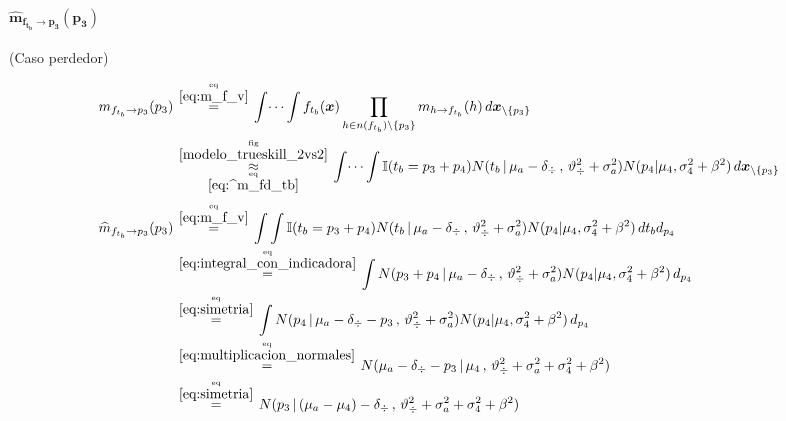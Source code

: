 \documentclass[article]{jss}
\newcommand\hfrac[2]{\genfrac{}{}{0pt}{}{#1}{#2}} %
\begin{document}
\begin{appendix}
\paragraph{$\bm{\widehat{m}_{f_{t_b} \rightarrow p_3}(p_3)}$} (Caso perdedor)

\begin{equation}\label{eq:^m_ftb_p}
\begin{split}
m_{f_{t_b} \rightarrow p_3}(p_3) & \overset{\hfrac{\text{eq}}{\ref{eq:m_f_v}}}{=} \int \dots \int f_{t_b}(\bm{x}) \prod_{h \in n(f_{t_b}) \setminus \{p_3\} } m_{h \rightarrow f_{t_b}}(h) \, d\bm{x}_{\setminus \{p_3\} }  \\
&\overset{\hfrac{\text{fig}}{\ref{modelo_trueskill_2vs2}}}{\underset{\hfrac{\text{eq}}{\ref{eq:^m_fd_tb}}}{\approx}}  \int \dots \int \mathbb{I}(t_b = p_3 + p_4) N(t_b \, | \, \mu_a - \delta_{\div} \, , \, \vartheta_{\div}^2 + \sigma_a^2) N(p_4 | \mu_4 , \sigma_4^2 + \beta^2)  \, d\bm{x}_{\setminus \{p_3\} } \\[0.1cm]
\widehat{m}_{f_{t_b} \rightarrow p_3}(p_3)  & \overset{\hfrac{\text{eq}}{\ref{eq:m_f_v}}}{=} \int \int \mathbb{I}(t_b = p_3 + p_4) N(t_b \, | \, \mu_a - \delta_{\div} \, , \, \vartheta_{\div}^2 + \sigma_a^2) N(p_4 | \mu_4 , \sigma_4^2 + \beta^2) \, d{t_b} d_{p_4} \\
& \overset{\hfrac{\text{eq}}{\ref{eq:integral_con_indicadora}}}{=} \int N(p_3 + p_4 \, | \, \mu_a - \delta_{\div} \, , \, \vartheta_{\div}^2 + \sigma_a^2) N(p_4 | \mu_4 , \sigma_4^2 + \beta^2) \, d_{p_4} \\
& \overset{\hfrac{\text{eq}}{\ref{eq:simetria}}}{=} \int N(p_4 \, | \, \mu_a - \delta_{\div} - p_3 \, , \, \vartheta_{\div}^2 + \sigma_a^2) N(p_4 | \mu_4 , \sigma_4^2 + \beta^2) \, d_{p_4} \\
& \overset{\hfrac{\text{eq}}{\ref{eq:multiplicacion_normales}}}{=} N(\mu_a - \delta_{\div} - p_3  \,|\, \mu_4 \, , \, \vartheta_{\div}^2 + \sigma_a^2 + \sigma_4^2 + \beta^2)   \\
& \overset{\hfrac{\text{eq}}{\ref{eq:simetria}}}{=}   N(  p_3  \,|\, (\mu_a - \mu_4)  - \delta_{\div} \, , \, \vartheta_{\div}^2 + \sigma_a^2 + \sigma_4^2 + \beta^2)  \\
\end{split}
\end{equation}































\end{appendix}
\end{document}
